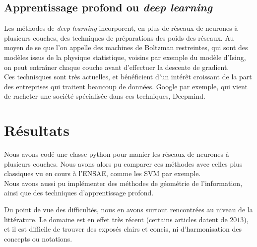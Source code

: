 \documentclass{article}
\begin{document}
\subsection{Apprentissage profond ou \textit{deep learning}}

Les méthodes de \textit{deep learning} incorporent, en plus de réseaux de neurones à plusieurs couches, des techniques de préparations des poids des réseaux. Au moyen de se que l'on appelle des machines de Boltzman restreintes, qui sont des modèles issus de la physique statistique, voisins par exemple du modèle d'Ising, on peut entraîner chaque couche avant d'effectuer la descente de gradient.\\

Ces technisques sont très actuelles, et bénéficient d'un intérêt croissant de la part des entreprises qui traitent beaucoup de données. Google par exemple, qui vient de racheter une société spécialisée dans ces techniques, Deepmind.\\

\section{Résultats}

Nous avons codé une classe python pour manier les réseaux de neurones à plusieurs couches. Nous avons alors pu comparer ces méthodes avec celles plus classiques vu en cours à l'ENSAE, comme les SVM par exemple.\\

Nous avons aussi pu implémenter des méthodes de géométrie de l'information, ainsi que des techniques d'apprentissage profond. 

Du point de vue des difficultés, nous en avons surtout rencontrées au niveau de la littérature. Le domaine est en effet très récent (certains articles datent de $2013$), et il est difficile de trouver des exposés clairs et concis, ni d'harmonisation des concepts ou notations. \\
\end{document}
